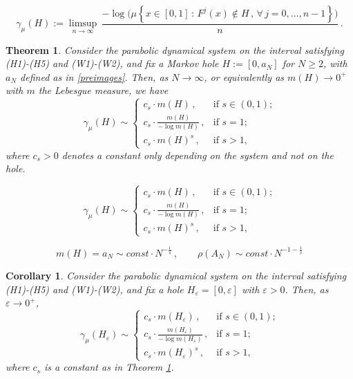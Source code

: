 \documentclass[10pt,a4paper]{amsart}
\newtheorem{theorem}{Theorem}
\newtheorem{corollary}{Corollary}
\newcommand{\eps}{\varepsilon}
\newcommand{\set}[1]{\left\{#1\right\}}
\begin{document}
\begin{equation}\label{escape-rate-F}
\gamma_\mu(H) := \limsup_{n\to \infty}\, \frac {-\log \Big( \mu\set{x\in [0,1]\, :\, F^j(x) \not\in H\, ,\, \forall\, j=0,\dots, n-1} \Big)}{n}\, .
\end{equation}

\begin{theorem}\label{thm:shrinking}
Consider the parabolic dynamical system on the interval satisfying (H1)-(H5) and (W1)-(W2), and fix a Markov hole $H:=[0,a_N]$ for $N \ge 2$, with $a_N$ defined as in \eqref{preimages}. Then, as $N\to \infty$, or equivalently as $m(H)\to 0^+$ with $m$ the Lebesgue measure, we have
\begin{equation}\label{final-formula}
\gamma_\mu(H) \sim \left\{ \begin{array}{ll} c_s \cdot m(H)\, , & \text{if $s\in (0,1)$;}\\[0.2cm] c_s \cdot \frac{m(H)}{-\log m(H)}\, , & \text{if $s=1$;}\\[0.2cm] c_s \cdot m(H)^s\, , & \text{if $s>1$,} \end{array} \right.
\end{equation}
where $c_s>0$ denotes a constant only depending on the system and not on the hole.
\end{theorem}

\begin{equation}
\gamma_\mu(H) \sim \left\{ \begin{array}{ll} c_s \cdot m(H)\, , & \text{if $s\in (0,1)$;}\\[0.2cm] c_s \cdot \frac{m(H)}{-\log m(H)}\, , & \text{if $s=1$;}\\[0.2cm] c_s \cdot m(H)^s\, , & \text{if $s>1$,} \end{array} \right.
\end{equation}

\begin{equation}\label{asymp-an}
m(H) = a_N \sim const \cdot N^{-\frac 1s}\, ,\qquad \rho(A_N) \sim const \cdot N^{-1-\frac 1s}
\end{equation}

\begin{corollary} \label{general-hole}
Consider the parabolic dynamical system on the interval satisfying (H1)-(H5) and (W1)-(W2), and fix a hole $H_\eps=[0,\eps]$ with $\eps>0$. Then, as $\eps\to 0^+$,
\[
\gamma_\mu(H_\eps) \sim \left\{ \begin{array}{ll} c_s \cdot m(H_\eps)\, , & \text{if $s\in (0,1)$;}\\[0.2cm] c_s \cdot \frac{m(H_\eps)}{-\log m(H_\eps)}\, , & \text{if $s=1$;}\\[0.2cm] c_s \cdot m(H_\eps)^s\, , & \text{if $s>1$,} \end{array} \right.
\]
where $c_s$ is a constant as in Theorem \ref{thm:shrinking}.
\end{corollary}
\end{document}
